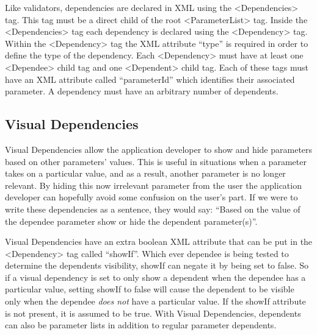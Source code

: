 Like validators, dependencies are declared in XML using the <Dependencies> tag. This tag must be a direct child
of the root <ParameterList> tag. Inside the <Dependencies> tag each dependency is declared using the <Dependency> tag. Within the
<Dependency> tag the XML attribute ``type'' is required in order to define the type of the dependency. Each <Dependency> must have at least
one <Dependee> child tag and one <Dependent> child tag. Each of these tags must have an XML attribute called ``parameterId'' which identifies
their associated parameter. A dependency must have an arbitrary number of dependents.

\subsection{Visual Dependencies}
Visual Dependencies allow the application developer to show and hide parameters based on other parameters' values. This is useful in situations
when a parameter takes on a particular value, and as a result, another parameter is no longer relevant. By hiding this now irrelevant parameter from the user the
application developer can hopefully avoid some confusion on the user's part. If we were to write these dependencies as a sentence, they would say: ``Based on
the value of the dependee parameter show or hide the dependent parameter(s)''.

Visual Dependencies have an extra boolean XML attribute that can be put in the <Dependency> tag called ``showIf''. Which ever dependee is being tested to 
determine the dependents visibility, showIf can negate it by being set to false. So if a visual dependency is set to only show a dependent when the
dependee has a particular value, setting showIf to false will cause the dependent to be visible only when the dependee \emph{does not} have a particular
value. If the showIf attribute is not present, it is assumed to be true. With Visual Dependencies, dependents can also be parameter lists in addition to regular
parameter dependents.


